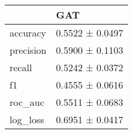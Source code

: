 \begin{tabular}{ll}
\toprule
 & GAT \\
\midrule
accuracy & 0.5522 ± 0.0497 \\
precision & 0.5900 ± 0.1103 \\
recall & 0.5242 ± 0.0372 \\
f1 & 0.4555 ± 0.0616 \\
roc_auc & 0.5511 ± 0.0683 \\
log_loss & 0.6951 ± 0.0417 \\
\bottomrule
\end{tabular}
